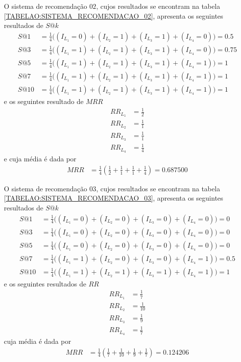 O sistema de recomendação \(02\), cujos resultados se encontram na tabela \ref{TABELAO:SISTEMA_RECOMENDACAO_02}, apresenta os seguintes resultados de \(S@k\)
\begin{align}
S@1 &= \frac{1}{4}  \Big( (I_{L_{1}} = 0) + (I_{L_{2}} = 1) + (I_{L_{3}} = 1) + (I_{L_{4}} = 0) \Big) =	0.5		\\
S@3 &= \frac{1}{4}  \Big( (I_{L_{1}} = 1) + (I_{L_{2}} = 1) + (I_{L_{3}} = 1) + (I_{L_{4}} = 0) \Big) =	0.75	\\
S@5 &= \frac{1}{4}  \Big( (I_{L_{1}} = 1) + (I_{L_{2}} = 1) + (I_{L_{3}} = 1) + (I_{L_{4}} = 1) \Big) =	1		\\
S@7 &= \frac{1}{4}  \Big( (I_{L_{1}} = 1) + (I_{L_{2}} = 1) + (I_{L_{3}} = 1) + (I_{L_{4}} = 1) \Big) =	1		\\
S@10 &= \frac{1}{4} \Big( (I_{L_{1}} = 1) + (I_{L_{2}} = 1) + (I_{L_{3}} = 1) + (I_{L_{4}} = 1) \Big) =	1		
\end{align}
e os seguintes resultado de \(MRR\)
\begin{align}
RR_{L_{1}} &= \frac{1}{2}		\\
RR_{L_{2}} &= \frac{1}{1}		\\
RR_{L_{3}} &= \frac{1}{1}		\\
RR_{L_{4}} &= \frac{1}{4}		
\end{align}
e cuja média é dada por 
\begin{align}
MRR &= \frac{1}{4} \left( \frac{1}{2} + \frac{1}{1} + \frac{1}{1} + \frac{1}{4} \right) = 0.687500
\end{align}

O sistema de recomendação \(03\), cujos resultados se encontram na tabela \ref{TABELAO:SISTEMA_RECOMENDACAO_03}, apresenta os seguintes resultados de \(S@k\)
\begin{align}
S@1 &= \frac{1}{4}  \Big( (I_{L_{1}} = 0) + (I_{L_{2}} = 0) + (I_{L_{3}} = 0) + (I_{L_{4}} = 0) \Big) =	0		\\
S@3 &= \frac{1}{4}  \Big( (I_{L_{1}} = 0) + (I_{L_{2}} = 0) + (I_{L_{3}} = 0) + (I_{L_{4}} = 0) \Big) =	0		\\
S@5 &= \frac{1}{4}  \Big( (I_{L_{1}} = 0) + (I_{L_{2}} = 0) + (I_{L_{3}} = 0) + (I_{L_{4}} = 0) \Big) =	0		\\
S@7 &= \frac{1}{4}  \Big( (I_{L_{1}} = 1) + (I_{L_{2}} = 0) + (I_{L_{3}} = 0) + (I_{L_{4}} = 1) \Big) =	0.5		\\
S@10 &= \frac{1}{4} \Big( (I_{L_{1}} = 1) + (I_{L_{2}} = 1) + (I_{L_{3}} = 1) + (I_{L_{4}} = 1) \Big) =	1		
\end{align}
e os seguintes resultados de \(RR\)
\begin{align}
RR_{L_{1}} &= \frac{1}{7}		\\
RR_{L_{2}} &= \frac{1}{10}		\\
RR_{L_{3}} &= \frac{1}{9}		\\
RR_{L_{4}} &= \frac{1}{7}		
\end{align}
cuja média é dada por
\begin{align}
MRR &= \frac{1}{4} \left( \frac{1}{7} + \frac{1}{10} + \frac{1}{9} + \frac{1}{7} \right) = 0.124206
\end{align}

